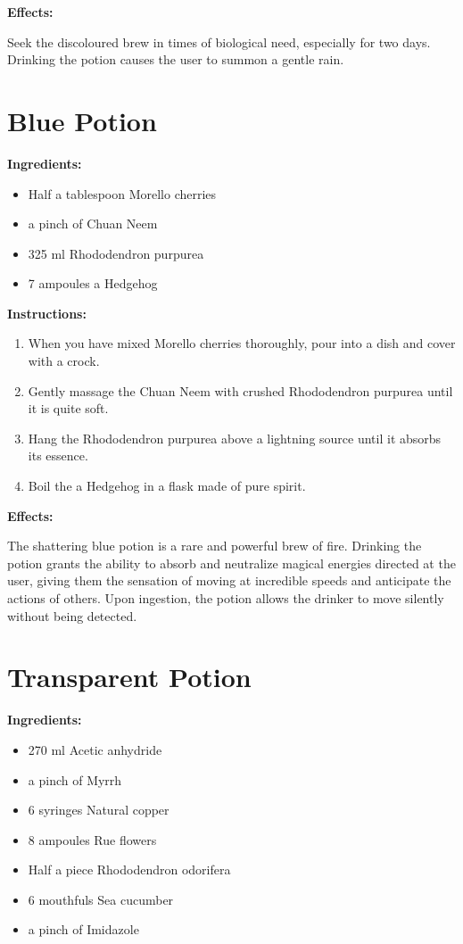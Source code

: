 \documentclass{article}
\begin{document}
\textbf{Effects:}

Seek the discoloured brew in times of biological need, especially for two days. Drinking the potion causes the user to summon a gentle rain.

\newpage
\section*{Blue Potion}

\textbf{Ingredients:}

\begin{itemize}
  \item Half a tablespoon Morello cherries
  \item a pinch of Chuan Neem
  \item 325 ml Rhododendron purpurea
  \item 7 ampoules a Hedgehog
\end{itemize}

\textbf{Instructions:}

\begin{enumerate}
  \item When you have mixed Morello cherries thoroughly, pour into a dish and cover with a crock.
  \item Gently massage the Chuan Neem with crushed Rhododendron purpurea until it is quite soft.
  \item Hang the Rhododendron purpurea above a lightning source until it absorbs its essence.
  \item Boil the a Hedgehog in a flask made of pure spirit.
\end{enumerate}

\textbf{Effects:}

The shattering blue potion is a rare and powerful brew of fire. Drinking the potion grants the ability to absorb and neutralize magical energies directed at the user, giving them the sensation of moving at incredible speeds and anticipate the actions of others. Upon ingestion, the potion allows the drinker to move silently without being detected.

\newpage
\section*{Transparent Potion}

\textbf{Ingredients:}

\begin{itemize}
  \item 270 ml Acetic anhydride
  \item a pinch of Myrrh
  \item 6 syringes Natural copper
  \item 8 ampoules Rue flowers
  \item Half a piece Rhododendron odorifera
  \item 6 mouthfuls Sea cucumber
  \item a pinch of Imidazole
\end{itemize}
\end{document}

